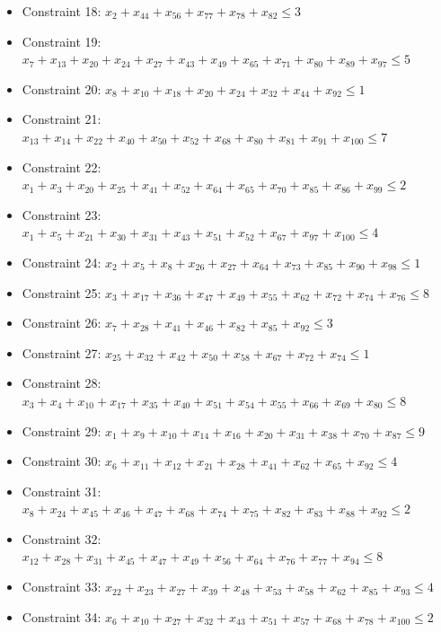 \documentclass[11pt]{article}
\begin{document}
\begin{itemize}
\item Constraint 18: $x_{2} + x_{44} + x_{56} + x_{77} + x_{78} + x_{82} \le 3$
\item Constraint 19: $x_{7} + x_{13} + x_{20} + x_{24} + x_{27} + x_{43} + x_{49} + x_{65} + x_{71} + x_{80} + x_{89} + x_{97} \le 5$
\item Constraint 20: $x_{8} + x_{10} + x_{18} + x_{20} + x_{24} + x_{32} + x_{44} + x_{92} \le 1$
\item Constraint 21: $x_{13} + x_{14} + x_{22} + x_{40} + x_{50} + x_{52} + x_{68} + x_{80} + x_{81} + x_{91} + x_{100} \le 7$
\item Constraint 22: $x_{1} + x_{3} + x_{20} + x_{25} + x_{41} + x_{52} + x_{64} + x_{65} + x_{70} + x_{85} + x_{86} + x_{99} \le 2$
\item Constraint 23: $x_{1} + x_{5} + x_{21} + x_{30} + x_{31} + x_{43} + x_{51} + x_{52} + x_{67} + x_{97} + x_{100} \le 4$
\item Constraint 24: $x_{2} + x_{5} + x_{8} + x_{26} + x_{27} + x_{64} + x_{73} + x_{85} + x_{90} + x_{98} \le 1$
\item Constraint 25: $x_{3} + x_{17} + x_{36} + x_{47} + x_{49} + x_{55} + x_{62} + x_{72} + x_{74} + x_{76} \le 8$
\item Constraint 26: $x_{7} + x_{28} + x_{41} + x_{46} + x_{82} + x_{85} + x_{92} \le 3$
\item Constraint 27: $x_{25} + x_{32} + x_{42} + x_{50} + x_{58} + x_{67} + x_{72} + x_{74} \le 1$
\item Constraint 28: $x_{3} + x_{4} + x_{10} + x_{17} + x_{35} + x_{40} + x_{51} + x_{54} + x_{55} + x_{66} + x_{69} + x_{80} \le 8$
\item Constraint 29: $x_{1} + x_{9} + x_{10} + x_{14} + x_{16} + x_{20} + x_{31} + x_{38} + x_{70} + x_{87} \le 9$
\item Constraint 30: $x_{6} + x_{11} + x_{12} + x_{21} + x_{28} + x_{41} + x_{62} + x_{65} + x_{92} \le 4$
\item Constraint 31: $x_{8} + x_{24} + x_{45} + x_{46} + x_{47} + x_{68} + x_{74} + x_{75} + x_{82} + x_{83} + x_{88} + x_{92} \le 2$
\item Constraint 32: $x_{12} + x_{28} + x_{31} + x_{45} + x_{47} + x_{49} + x_{56} + x_{64} + x_{76} + x_{77} + x_{94} \le 8$
\item Constraint 33: $x_{22} + x_{23} + x_{27} + x_{39} + x_{48} + x_{53} + x_{58} + x_{62} + x_{85} + x_{93} \le 4$
\item Constraint 34: $x_{6} + x_{10} + x_{27} + x_{32} + x_{43} + x_{51} + x_{57} + x_{68} + x_{78} + x_{100} \le 2$

\end{itemize}
\end{document}
